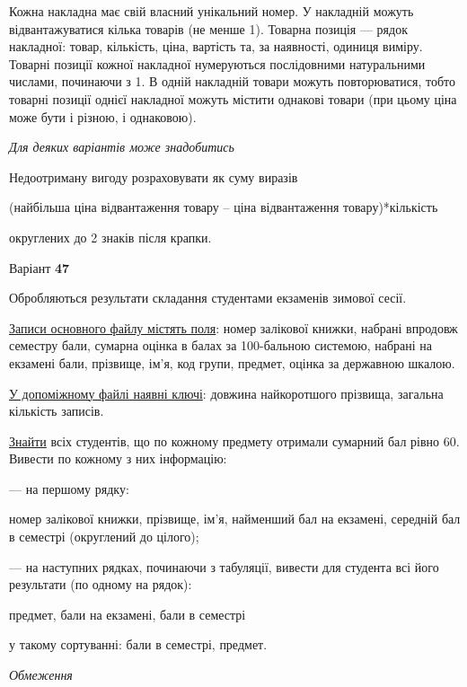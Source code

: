 \documentclass[11pt, ukrainian]{article}
\begin{document}
Кожна накладна має свій власний унікальний номер.
У накладній можуть відвантажуватися кілька товарів (не менше 1).
Товарна позиція --- рядок накладної: товар, кількість, ціна, вартість та, за наявності, одиниця виміру.
Товарні позиції кожної накладної нумеруються послідовними натуральними числами, починаючи з 1.
В одній накладній товари можуть повторюватися, 
тобто товарні позиції однієї накладної можуть містити однакові товари 
(при цьому ціна може бути і різною, і однаковою).

\bigskip\textit{Для деяких варіантів може знадобитись}

Недоотриману вигоду розраховувати як суму виразів
{\center (найбільша ціна відвантаження товару – ціна відвантаження товару)*кількість\par}

\bigskip
{\noindent} округлених до 2 знаків після крапки.




\par
\newpage
{\center Варіант  \No \textbf { 47 }\par}
\bigskip
Обробляються результати складання студентами екзаменів зимової сесії.

\underline{Записи основного файлу містять поля}: номер залікової книжки, набрані впродовж семестру бали, сумарна оцінка в балах за 100-бальною системою, набрані на екзамені бали, прізвище, ім’я, код групи, предмет, оцінка за державною шкалою.

\underline{У допоміжному файлі наявні ключі}: довжина найкоротшого прізвища, загальна кількість записів.

\underline{Знайти} всіх студентів, що по кожному предмету отримали сумарний бал рівно 60. Вивести по кожному з них інформацію:\par
{\noindent}--- на першому рядку:\par
номер залікової книжки, прізвище, ім’я, найменший бал на екзамені, середній бал в семестрі (округлений до цілого);

{\noindent}--- на наступних рядках, починаючи з табуляції, вивести для студента всі його результати (по одному на рядок):\par
предмет, бали на екзамені, бали в семестрі

{\noindent}у такому сортуванні: бали в семестрі, предмет.


\bigskip\textit{Обмеження}
\end{document}
